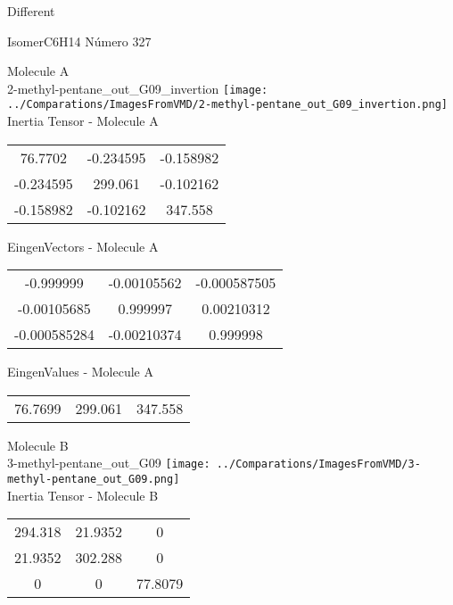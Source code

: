 \begin{center}
\vtab
\vtab
\textcolor{NavyBlue}{\Large Different}
\end{center}

 \newpage

\vtab[-2cm]
\begin{center}
{\large IsomerC6H14 \tab Número 327}
\end{center}
\begin{multicols}{2}
\begin{center}

Molecule A \\ 
2-methyl-pentane\_out\_G09\_invertion
\texttt{[image: ../Comparations/ImagesFromVMD/2-methyl-pentane\_out\_G09\_invertion.png]}
\\
Inertia Tensor - Molecule A \\
\vtab

\begin{tabular}{|c c c|}
76.7702	 & 	-0.234595	 & 	-0.158982	 \\
-0.234595	 & 	299.061	 & 	-0.102162	 \\
-0.158982	 & 	-0.102162	 & 	347.558
\end{tabular}

\vtab
 EingenVectors - Molecule A     \\
\vtab
\begin{tabular}{|c c c|}
-0.999999	 & 	-0.00105562	 & 	-0.000587505	 \\
-0.00105685	 & 	0.999997	 & 	0.00210312	 \\
-0.000585284	 & 	-0.00210374	 & 	0.999998
\end{tabular}

\vtab
 EingenValues - Molecule A     \\
\vtab
\begin{tabular}{|c c c|}
76.7699	 & 	299.061	 & 	347.558	 \\
\end{tabular}
\columnbreak

Molecule B \\ 
3-methyl-pentane\_out\_G09
\texttt{[image: ../Comparations/ImagesFromVMD/3-methyl-pentane\_out\_G09.png]}
\\
Inertia Tensor - Molecule B \\
\vtab

\begin{tabular}{|c c c|}
294.318	 & 	21.9352	 & 	0	 \\
21.9352	 & 	302.288	 & 	0	 \\
0	 & 	0	 & 	77.8079
\end{tabular}


\end{center}
\end{multicols}
